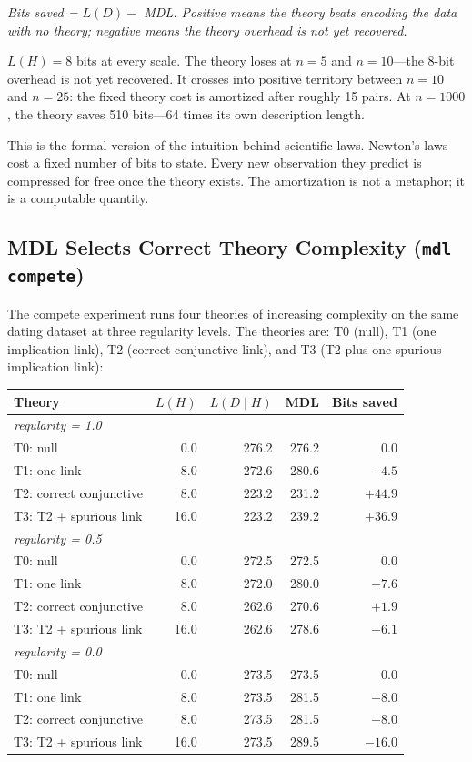 \textit{Bits saved = $L(D) -$ MDL. Positive means the theory beats
encoding the data with no theory; negative means the theory overhead
is not yet recovered.}

$L(H) = 8$ bits at every scale. The theory loses at $n = 5$ and
$n = 10$---the 8-bit overhead is not yet recovered. It crosses into
positive territory between $n = 10$ and $n = 25$: the fixed theory
cost is amortized after roughly 15 pairs. At $n = 1000$, the theory
saves 510 bits---64 times its own description length.

This is the formal version of the intuition behind scientific laws.
Newton's laws cost a fixed number of bits to state. Every new
observation they predict is compressed for free once the theory exists.
The amortization is not a metaphor; it is a computable quantity.

\subsection{MDL Selects Correct Theory Complexity (\texttt{mdl compete})}

The compete experiment runs four theories of increasing complexity on
the same dating dataset at three regularity levels. The theories are:
T0 (null), T1 (one implication link), T2 (correct conjunctive link),
and T3 (T2 plus one spurious implication link):

\begin{center}
\begin{tabular}{lrrrr}
\toprule
Theory & $L(H)$ & $L(D \mid H)$ & MDL & Bits saved \\
\midrule
\multicolumn{5}{l}{\textit{regularity = 1.0}} \\
T0: null                 &  0.0 & 276.2 & 276.2 &    $0.0$ \\
T1: one link             &  8.0 & 272.6 & 280.6 &   $-4.5$ \\
T2: correct conjunctive  &  8.0 & 223.2 & 231.2 & $\mathbf{+44.9}$ \\
T3: T2 + spurious link   & 16.0 & 223.2 & 239.2 &  $+36.9$ \\
\midrule
\multicolumn{5}{l}{\textit{regularity = 0.5}} \\
T0: null                 &  0.0 & 272.5 & 272.5 & $\mathbf{0.0}$ \\
T1: one link             &  8.0 & 272.0 & 280.0 &   $-7.6$ \\
T2: correct conjunctive  &  8.0 & 262.6 & 270.6 &   $+1.9$ \\
T3: T2 + spurious link   & 16.0 & 262.6 & 278.6 &   $-6.1$ \\
\midrule
\multicolumn{5}{l}{\textit{regularity = 0.0}} \\
T0: null                 &  0.0 & 273.5 & 273.5 & $\mathbf{0.0}$ \\
T1: one link             &  8.0 & 273.5 & 281.5 &   $-8.0$ \\
T2: correct conjunctive  &  8.0 & 273.5 & 281.5 &   $-8.0$ \\
T3: T2 + spurious link   & 16.0 & 273.5 & 289.5 &  $-16.0$ \\
\bottomrule
\end{tabular}
\end{center}

